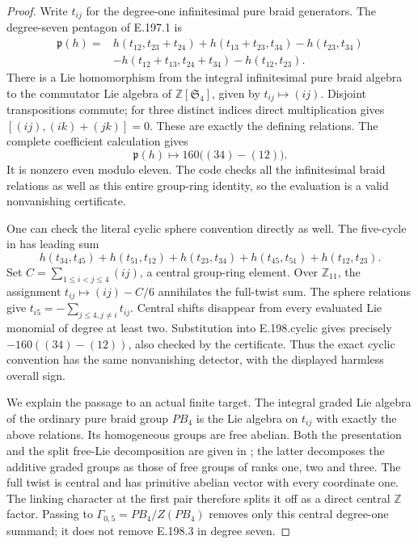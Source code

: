 \begin{proof}
Write \(t_{ij}\) for the degree-one infinitesimal pure braid
generators.  The degree-seven pentagon of E.197.1 is
\[
\begin{split}
\mathfrak p(h)={}&h(t_{12},t_{23}+t_{24})
                 +h(t_{13}+t_{23},t_{34})-h(t_{23},t_{34})\\
 &-h(t_{12}+t_{13},t_{24}+t_{34})-h(t_{12},t_{23}).
\end{split}
\tag{E.198.2}
\]
There is a Lie homomorphism from the integral infinitesimal
pure braid algebra to the commutator Lie algebra of
\(\mathbb Z[\mathfrak S_4]\), given by
\(t_{ij}\mapsto(ij)\).  Disjoint transpositions commute;
for three distinct indices direct multiplication gives
\([(ij),(ik)+(jk)]=0\).  These are exactly the defining
relations.  The complete coefficient calculation gives
\[
              \mathfrak p(h)\longmapsto
                          160\bigl((34)-(12)\bigr).
\tag{E.198.3}
\]
It is nonzero even modulo eleven.  The code checks all the
infinitesimal braid relations as well as this entire group-ring
identity, so the evaluation is a valid nonvanishing certificate.

One can check the literal cyclic sphere convention directly as well.
The five-cycle in \citet[Definition~1.1, p.~657]{LitSchneps2006Automorphisms}
has leading sum
\[
h(t_{34},t_{45})+h(t_{51},t_{12})+h(t_{23},t_{34})
             +h(t_{45},t_{51})+h(t_{12},t_{23}).
\tag{E.198.cyclic}
\]
Set \(C=\sum_{1\le i<j\le4}(ij)\), a central group-ring
element.  Over \(\mathbb Z_{11}\), the assignment
\(t_{ij}\mapsto(ij)-C/6\) annihilates the full-twist sum.
The sphere relations give
\(t_{i5}=-\sum_{j\le4,j\ne i}t_{ij}\).
Central shifts disappear from every evaluated Lie monomial of
degree at least two.  Substitution into E.198.cyclic gives precisely
\(-160((34)-(12))\), also checked by the certificate.
Thus the exact cyclic convention has the same nonvanishing
detector, with the displayed harmless overall sign.

We explain the passage to an actual finite target.  The integral
graded Lie algebra of the ordinary pure braid group \(PB_4\)
is the Lie algebra on \(t_{ij}\) with exactly the above
relations.  Its homogeneous groups are free abelian.  Both the
presentation and the split free-Lie decomposition are given in
\citet[\S2, pp.~366--367]{SymCohenPrassidis2006}; the latter
decomposes the additive graded groups as those of free groups
of ranks one, two and three.  The full twist is central and
has primitive abelian vector with every coordinate one.
The linking character at the first pair therefore splits it
off as a direct central \(\mathbb Z\) factor.  Passing to
\(\Gamma_{0,5}=PB_4/Z(PB_4)\) removes only this central
degree-one summand; it does not remove E.198.3 in degree seven.


\end{proof}
